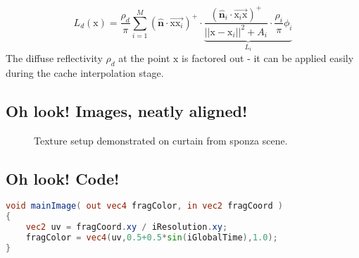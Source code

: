 \documentclass[thesis.tex]{subfiles}
\begin{document}
\begin{equation} \label{eq:rsmdiffuse}
L_d (\mathrm{x}) = \frac{\rho_d}{\pi} \sum\limits_{i=1}^{M} 
(\hat{\mathbf{n}} \cdot \overrightarrow{\mathrm{x}\mathrm{x}_i} )^+ \cdot
\underbrace{\frac{(\hat{\mathbf{n}}_i\cdot \overrightarrow{\mathrm{x}_i\mathrm{x}})^+}{||\mathrm{x} - \mathrm{x}_i||^2 + A_i} \cdot  \frac{\rho_i}{\pi} \phi_i}_{L_i}
\end{equation}
The diffuse reflectivity $\rho_d$ at the point $\mathrm{x}$ is factored out - it can be applied easily during the cache interpolation stage.

\subsection{Oh look! Images, neatly aligned!}
\begin{figure}[h!]
\centering
{}
\caption{Texture setup demonstrated on curtain from sponza scene.}
\label{fig:texturesample}
\end{figure}

\subsection{Oh look! Code!} \label{sec:impl:cachealloc}


\begin{lstlisting}[language=GLSL]
void mainImage( out vec4 fragColor, in vec2 fragCoord )
{
	vec2 uv = fragCoord.xy / iResolution.xy;
	fragColor = vec4(uv,0.5+0.5*sin(iGlobalTime),1.0);
}
\end{lstlisting}

\subfilebib %
\end{document}
